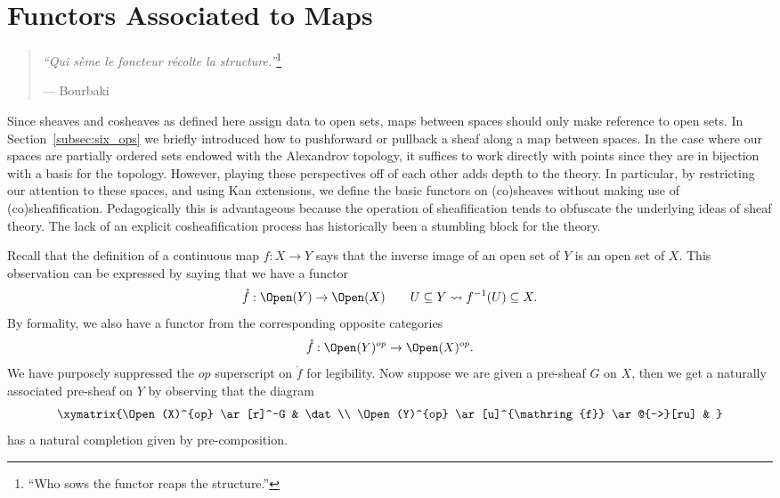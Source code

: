 
%
%

\chapter{Functors Associated to Maps}
\label{sec:maps}

\begin{quote}
{\em``Qui s\`eme le foncteur r\'ecolte la structure.''}\footnote{``Who sows the functor reaps the structure.''}
\begin{flushright} --- Bourbaki \end{flushright}
\end{quote}

Since sheaves and cosheaves as defined here assign data to open sets, maps between spaces should only make reference to open sets. In Section~\ref{subsec:six_ops} we briefly introduced how to pushforward or pullback a sheaf along a map between spaces. In the case where our spaces are partially ordered sets endowed with the Alexandrov topology, it suffices to work directly with points since they are in bijection with a basis for the topology. However, playing these perspectives off of each other adds depth to the theory. In particular, by restricting our attention to these spaces, and using Kan extensions, we define the basic functors on (co)sheaves without making use of (co)sheafification. Pedagogically this is advantageous because the operation of sheafification tends to obfuscate the underlying ideas of sheaf theory. The lack of an explicit cosheafification process has historically been a stumbling block for the theory.

Recall that the definition of a continuous map $f:X\to Y$ says that the inverse image of an open set of $Y$ is an open set of $X$. This observation can be expressed by saying that we have a functor
\[
\mathring{f}:\Open(Y)\to\Open(X) \qquad U\subseteq Y \rightsquigarrow f^{-1}(U)\subseteq X.
\]
By formality, we also have a functor from the corresponding opposite categories
\[
\mathring{f}:\Open(Y)^{op}\to\Open(X)^{op}.
\]
We have purposely suppressed the $op$ superscript on $\mathring{f}$ for legibility. Now suppose we are given a pre-sheaf $G$ on $X$, then we get a naturally associated pre-sheaf on $Y$ by observing that the diagram
\[
\xymatrix{\Open(X)^{op} \ar[r]^-G & \dat \\
\Open(Y)^{op} \ar[u]^{\mathring{f}} \ar@{-->}[ru] & }
\]
has a natural completion given by pre-composition. 

